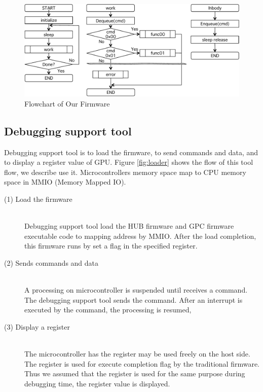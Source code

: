 \begin{figure}
\begin{center}
\includegraphics[width=12cm]{./img/firmware.pdf}
\end{center}
\caption{Flowchart of Our Firmware }
\label{fig:firmware}
\end{figure}


\subsection{Debugging support tool}
Debugging support tool is to load the firmware, to send commands and data, and to display a register value of GPU.
Figure \ref{fig:loader} shows the flow of this tool flow, we describe use it.
Microcontrollers memory space map to  CPU memory space in MMIO (Memory Mapped IO).

\begin{description}
\item[ (1) Load the firmware]\mbox{}\\
Debugging support tool load the HUB firmware and GPC firmware executable code to mapping address by MMIO. 
After the load completion, this firmware runs by set a flag in the specified register.
\item[ (2) Sends commands and data]\mbox{}\\
A processing on microcontroller is suspended until receives a command.
The debugging support tool sends the command.
After an interrupt is executed by the command, the processing is resumed,

\item[ (3) Display a register] \mbox{}\\
The microcontroller has the register may be used freely on the host side.
The register is used for execute completion flag by the traditional firmware.
Thus we assumed that the register is used for the same purpose during debugging time, 
the register value is displayed.
\end{description}


